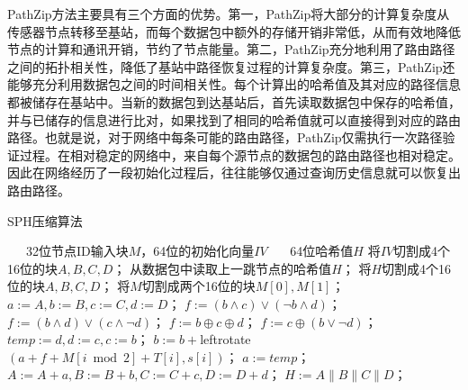 PathZip方法主要具有三个方面的优势。第一，PathZip将大部分的计算复杂度从传感器节点转移至基站，而每个数据包中额外的存储开销非常低，从而有效地降低节点的计算和通讯开销，节约了节点能量。第二，PathZip充分地利用了路由路径之间的拓扑相关性，降低了基站中路径恢复过程的计算复杂度。第三，PathZip还能够充分利用数据包之间的时间相关性。每个计算出的哈希值及其对应的路径信息都被储存在基站中。当新的数据包到达基站后，首先读取数据包中保存的哈希值，并与已储存的信息进行比对，如果找到了相同的哈希值就可以直接得到对应的路由路径。也就是说，对于网络中每条可能的路由路径，PathZip仅需执行一次路径验证过程。在相对稳定的网络中，来自每个源节点的数据包的路由路径也相对稳定。因此在网络经历了一段初始化过程后，往往能够仅通过查询历史信息就可以恢复出路由路径。
\begin{algorithm}[t]
\caption{SPH压缩算法}
\label{alg:501}
\begin{algorithmic}[1]
\REQUIRE ~~\
32位节点ID输入块$M$，64位的初始化向量$IV$
\ENSURE ~~\
64位哈希值$H$
                                       \label{alg:501:01}
    \STATE 将$IV$切割成4个16位的块$A,B,C,D$；                \label{alg:501:02}
\ELSE                                                        \label{alg:501:03}
    \STATE 从数据包中读取上一跳节点的哈希值$H$；             \label{alg:501:04}
    \STATE 将$H$切割成4个16位的块$A,B,C,D$；                 \label{alg:501:05}
\ENDIF                                                       \label{alg:501:06}
\STATE 将$M$切割成两个16位的块$M[0],M[1]$；                  \label{alg:501:07}
\STATE $a:=A, b:=B, c:=C, d:=D$；                            \label{alg:501:08}
\FOR {$i=1$ to 8}                                            \label{alg:501:09}
    \IF {$1\leq{i}\leq{2}$}                                  \label{alg:501:10}
        \STATE $f:={(b\land{c})}\lor{(\neg{b}\land{d})}$；   \label{alg:501:11}
    \ELSIF {$3\leq{i}\leq{4}$}                               \label{alg:501:12}
        \STATE $f:={(b\land{d})}\lor{(c\land{\neg{d}})}$；   \label{alg:501:13}
    \ELSIF {$5\leq{i}\leq{6}$}                               \label{alg:501:14}
        \STATE $f:=b\oplus{c}\oplus{d}$；                    \label{alg:501:15}
    \ELSIF {$7\leq{i}\leq{8}$}                               \label{alg:501:16}
        \STATE $f:=c\oplus{(b\lor{\neg{d}})}$；              \label{alg:501:17}
    \ENDIF                                                   \label{alg:501:18}
    \STATE $temp:=d,d:=c,c:=b$；                             \label{alg:501:19}
    \STATE $b:=b+$leftrotate$(a+f+M[i\bmod2]+T[i],s[i])$；   \label{alg:501:20}
    \STATE $a:=temp$；                                       \label{alg:501:21}
\ENDFOR                                                      \label{alg:501:22}
\STATE $A:=A+a, B:=B+b, C:=C+c, D:=D+d$；                    \label{alg:501:23}
\STATE $H:=A\|B\|C\|D$；                                     \label{alg:501:24}
\end{algorithmic}
\end{algorithm}
